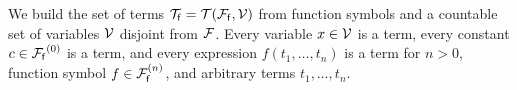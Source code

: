 
\begin{definition}\label{def:terms}
	We build the set of {\myem terms }${\mathcal T}_{\mathsf f} = {{\mathcal T}({\mathcal F}_{\mathsf f},{\mathcal V})}$ 
	from function symbols and a
	countable set of {\myem variables }${\mathcal V}$ disjoint from ${\mathcal F}$\!.
	Every variable $x\in{\mathcal V}$ is a term,
	every {\myem constant} $c\in{{\mathcal F}_{\mathsf f}}^{(0)}$ is a term, 
	and every expression $f(t_1,\ldots,t_n)$ is a term
	for $n>0$, function symbol $f\in{{\mathcal F}_{\mathsf f}^{(n)}}$,  
	and arbitrary terms $t_1,\ldots,t_n$.
	
	
\end{definition}

